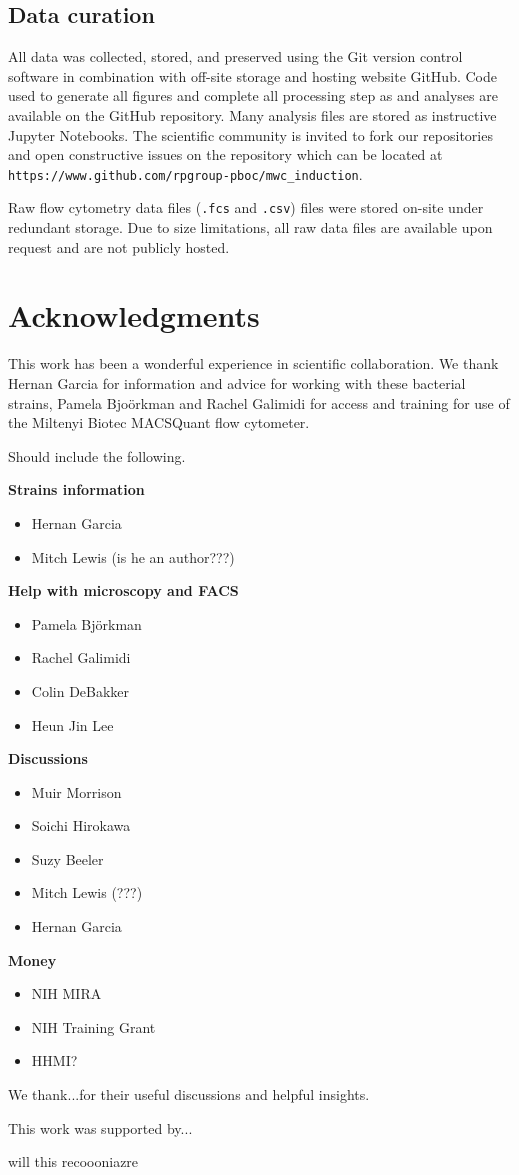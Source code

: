 \subsection*{Data curation}
All data was collected, stored, and preserved using the Git version control
software in combination with off-site storage and hosting website GitHub. Code
used to generate all figures and complete all processing step as and analyses
are available on the GitHub repository. Many analysis files are stored as
instructive Jupyter Notebooks. The scientific community is invited to fork our
repositories and open constructive issues on the repository which can be
located at \texttt{https://www.github.com/rpgroup-pboc/mwc\_induction}.

Raw flow cytometry data files (\texttt{.fcs} and \texttt{.csv}) files were
stored on-site under redundant storage. Due to size limitations, all raw data
files are available upon request and are not publicly hosted.

\section*{Acknowledgments}
This work has been a wonderful experience in scientific collaboration. We thank
Hernan Garcia for information and advice for working with these bacterial
strains, Pamela Bjo\"{o}rkman and Rachel Galimidi for access and training for
use of the Miltenyi Biotec MACSQuant flow cytometer.

Should include the following.

\textbf{Strains information}

\begin{itemize}
\item{Hernan Garcia}
\item{Mitch Lewis (is he an author???)}
\end{itemize}


\textbf{Help with microscopy and FACS}
\begin{itemize}
\item{Pamela Bj\"orkman}
\item{Rachel Galimidi}
\item{Colin DeBakker}
\item{Heun Jin Lee}
\end{itemize}

\textbf{Discussions}
\begin{itemize}
\item{Muir Morrison}
\item{Soichi Hirokawa}
\item{Suzy Beeler}
\item{Mitch Lewis (???)}
\item{Hernan Garcia}
\end{itemize}

\textbf{Money}
\begin{itemize}
\item{NIH MIRA}
\item{NIH Training Grant}
\item{HHMI?}
\end{itemize}
We thank...for their useful discussions and helpful insights.

This work was supported by...

will this recoooniazre
